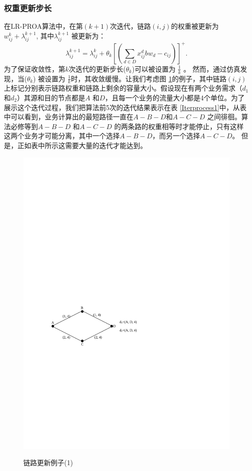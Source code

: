 \subsubsection{权重更新步长}
在LR-PROA算法中，在第$(k+1)$次迭代，链路$(i,j)$的权重被更新为$w_{ij}^{k} + \lambda_{ij}^{k+1}$, 其中$\lambda_{ij}^{k+1}$ 被更新为：
\begin{equation}\label{Iter}
\lambda_{ij}^{k+1} = \lambda_{ij}^k + \theta_k[(\sum\limits_{d \in D}x_{ij}^dbw_d - c_{ij})]^+.
\end{equation}
为了保证收敛性，第$k$次迭代的更新步长($\theta_k$)可以被设置为 $\frac{1}{k}$ 。 然而，通过仿真发现，当($\theta_k$) 被设置为 $\frac{1}{k}$时，其收敛缓慢。让我们考虑图 \ref{u1}的例子，其中链路$(i,j)$ 上标记分别表示链路权重和链路上剩余的容量大小。假设现在有两个业务需求（$d_1$ 和$d_2$）其源和目的节点都是$A$ 和$D$，且每一个业务的流量大小都是4个单位。为了展示这个迭代过程，我们把算法前5次的迭代结果表示在表 \ref{Iterprocess1}中，从表中可以看到，业务计算出的最短路径一直在$A-B-D$和$A-C-D$ 之间徘徊。算法必修等到$A-B-D$ 和$A-C-D$ 的两条路的权重相等时才能停止，只有这样这两个业务才可能分离，其中一个选择$A-B-D$，而另一个选择$A-C-D$。 但是，正如表中所示这需要大量的迭代才能达到。
\begin{figure}
\setlength{\belowcaptionskip}{-0.1cm}
\begin{center}
{\includegraphics[width=0.4 \textwidth]{figures/IterNum.pdf}}
\end{center}
\caption{{\footnotesize{链路更新例子(1)}}}
\label{u1}
\end{figure}
